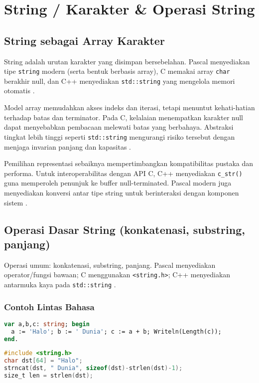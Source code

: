 \documentclass[../main.tex]{subfiles}
\begin{document}
\chapter{String / Karakter \& Operasi String}
\section{String sebagai Array Karakter}
String adalah urutan karakter yang disimpan bersebelahan. Pascal menyediakan tipe \texttt{string} modern (serta bentuk berbasis array), C memakai array \texttt{char} berakhir null, dan C++ menyediakan \texttt{std::string} yang mengelola memori otomatis \parencite{pascal-tutorial-wikibooks,iso-c-draft-n1570,cpp-strings}.

Model array memudahkan akses indeks dan iterasi, tetapi menuntut kehati-hatian terhadap batas dan terminator. Pada C, kelalaian menempatkan karakter null dapat menyebabkan pembacaan melewati batas yang berbahaya. Abstraksi tingkat lebih tinggi seperti \texttt{std::string} mengurangi risiko tersebut dengan menjaga invarian panjang dan kapasitas \parencite{cpp-strings}.

Pemilihan representasi sebaiknya mempertimbangkan kompatibilitas pustaka dan performa. Untuk interoperabilitas dengan API C, C++ menyediakan \texttt{c\_str()} guna memperoleh penunjuk ke buffer null-terminated. Pascal modern juga menyediakan konversi antar tipe string untuk berinteraksi dengan komponen sistem \parencite{free-pascal-docs}.

\section{Operasi Dasar String (konkatenasi, substring, panjang)}
Operasi umum: konkatenasi, substring, panjang. Pascal menyediakan operator/fungsi bawaan; C menggunakan \texttt{<string.h>}; C++ menyediakan antarmuka kaya pada \texttt{std::string} \parencite{c-strings-h,cpp-strings,free-pascal-docs}.

\subsection{Contoh Lintas Bahasa}
\begin{lstlisting}[language=Pascal, caption={Konkatenasi dan panjang di Pascal}]
var a,b,c: string; begin
  a := 'Halo'; b := ' Dunia'; c := a + b; Writeln(Length(c));
end.
\end{lstlisting}

\begin{lstlisting}[language=C, caption={Konkatenasi aman di C}]
#include <string.h>
char dst[64] = "Halo";
strncat(dst, " Dunia", sizeof(dst)-strlen(dst)-1);
size_t len = strlen(dst);
\end{lstlisting}
\end{document}
